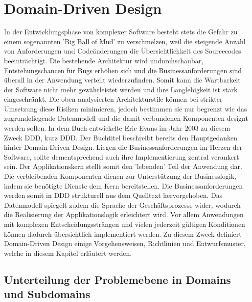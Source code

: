 \section{Domain-Driven Design}

In der Entwicklungsphase von komplexer Software besteht stets die Gefahr zu einem sogenannten 'Big Ball of Mud' zu verschmelzen, weil die steigende Anzahl von Anforderungen und Codeänderungen die Übersichtlichkeit des Sourcecodes beeinträchtigt. Die bestehende Architektur wird undurchschaubar, Entstehungschancen für Bugs erhöhen sich und die Businessanforderungen sind überall in der Anwendung verteilt wiederzufinden. Somit kann die Wartbarkeit der Software nicht mehr gewährleistet werden und ihre Langlebigkeit ist stark eingeschränkt. \cite{bbom.1999} Die oben analysierten Architekturstile können bei strikter Umsetzung diese Risiken minimieren, jedoch bestimmen sie nur begrenzt wie das zugrundeliegende Datenmodell und die damit verbundenen Komponenten designt werden sollen. In dem Buch  entwickelte Eric Evans im Jahr 2003 zu diesem Zweck \acrlong{DDD}, kurz \acrshort{DDD}. Der Buchtitel beschreibt bereits den Hauptgedanken hinter Domain-Driven Design. Liegen die Businessanforderungen im Herzen der Software, sollte dementsprechend auch ihre Implementierung zentral verankert sein. Der Applikationskern stellt somit den 'lebenden' Teil der Anwendung dar. Die verbleibenden Komponenten dienen zur Unterstützung der Businesslogik, indem sie benötigte Dienste dem Kern bereitstellen. Die Businessanforderungen werden somit in DDD strukturell aus dem Quelltext hervorgehoben. Das Datenmodell spiegelt zudem die Sprache der Geschäftsprozesse wider, wodurch die Realisierung der Applikationslogik erleichtert wird. Vor allem Anwendungen mit komplexen Entscheidungssträngen und vielen jederzeit gültigen Konditionen können dadurch übersichtlich implementiert werden. Zu diesem Zweck definiert Domain-Driven Design einige Vorgehensweisen, Richtlinien und Entwurfsmuster, welche in diesem Kapitel erläutert werden. \cite{Evans.2011, Vernon.2015}

\subsection{Unterteilung der Problemebene in Domains und Subdomains}

